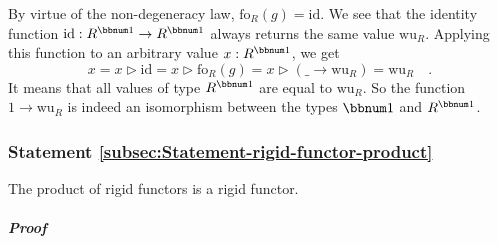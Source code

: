By virtue of the non-degeneracy law, $\text{fo}_{R}(g)=\text{id}$.
We see that the identity function $\text{id}:R^{\bbnum 1}\rightarrow R^{\bbnum 1}$
always returns the same value $\text{wu}_{R}$. Applying this function
to an arbitrary value $x:R^{\bbnum 1}$, we get
\[
x=x\triangleright\text{id}=x\triangleright\text{fo}_{R}(g)=x\triangleright(\_\rightarrow\text{wu}_{R})=\text{wu}_{R}\quad.
\]
It means that all values of type $R^{\bbnum 1}$ are equal to $\text{wu}_{R}$.
So the function $1\rightarrow\text{wu}_{R}$ is indeed an isomorphism
between the types $\bbnum 1$ and $R^{\bbnum 1}$.

\subsubsection{Statement \label{subsec:Statement-rigid-functor-product}\ref{subsec:Statement-rigid-functor-product}}

The product of rigid functors is a rigid functor.

\subparagraph{Proof}

